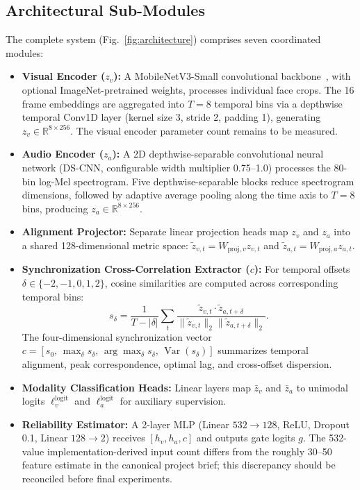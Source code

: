 \documentclass[conference]{IEEEtran}
\begin{document}
\subsection{Architectural Sub-Modules}
The complete system (Fig.~\ref{fig:architecture}) comprises seven coordinated modules:
\begin{itemize}
    \item \textbf{Visual Encoder ($z_v$):} A MobileNetV3-Small convolutional backbone~\cite{howard2019}, with optional ImageNet-pretrained weights, processes individual face crops. The 16 frame embeddings are aggregated into $T=8$ temporal bins via a depthwise temporal Conv1D layer (kernel size 3, stride 2, padding 1), generating $z_v \in \mathbb{R}^{8 \times 256}$. The visual encoder parameter count remains to be measured.
    \item \textbf{Audio Encoder ($z_a$):} A 2D depthwise-separable convolutional neural network (DS-CNN, configurable width multiplier 0.75--1.0) processes the 80-bin log-Mel spectrogram. Five depthwise-separable blocks reduce spectrogram dimensions, followed by adaptive average pooling along the time axis to $T=8$ bins, producing $z_a \in \mathbb{R}^{8 \times 256}$.
    \item \textbf{Alignment Projector:} Separate linear projection heads map $z_v$ and $z_a$ into a shared 128-dimensional metric space: $\tilde{z}_{v,t} = W_{\mathrm{proj},v} z_{v,t}$ and $\tilde{z}_{a,t} = W_{\mathrm{proj},a} z_{a,t}$.
    \item \textbf{Synchronization Cross-Correlation Extractor ($c$):} For temporal offsets $\delta \in \{-2, -1, 0, 1, 2\}$, cosine similarities are computed across corresponding temporal bins:
    \begin{equation}
      s_\delta = \frac{1}{T - |\delta|} \sum_{t} \frac{\tilde{z}_{v,t} \cdot \tilde{z}_{a,t+\delta}}{\|\tilde{z}_{v,t}\|_2 \|\tilde{z}_{a,t+\delta}\|_2}.
    \end{equation}
    The four-dimensional synchronization vector $c = [s_0, \, \max_\delta s_\delta, \, \arg\max_\delta s_\delta, \, \operatorname{Var}(s_\delta)]$ summarizes temporal alignment, peak correspondence, optimal lag, and cross-offset dispersion.
    \item \textbf{Modality Classification Heads:} Linear layers map $\bar{z}_v$ and $\bar{z}_a$ to unimodal logits $\ell_v^{\mathrm{logit}}$ and $\ell_a^{\mathrm{logit}}$ for auxiliary supervision.
    \item \textbf{Reliability Estimator:} A 2-layer MLP (Linear $532 \to 128$, ReLU, Dropout 0.1, Linear $128 \to 2$) receives $[h_v,h_a,c]$ and outputs gate logits $g$. The 532-value implementation-derived input count differs from the roughly 30--50 feature estimate in the canonical project brief; this discrepancy should be reconciled before final experiments.

\end{itemize}
\end{document}
